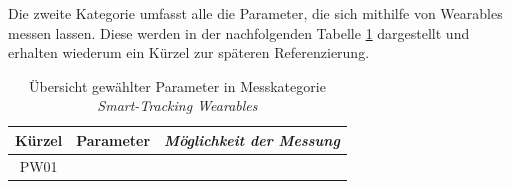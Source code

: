 Die zweite Kategorie umfasst alle die Parameter, die sich mithilfe von Wearables messen lassen. Diese werden in der nachfolgenden Tabelle \ref{tab:pw} dargestellt und erhalten wiederum ein Kürzel zur späteren Referenzierung.


\begin{table}[htbp]
	\caption{Übersicht gewählter Parameter in Messkategorie \textit{Smart-Tracking Wearables}}
	\begin{center}
		\begin{tabular}{c c c }
			\hline
			Kürzel& \textbf{Parameter} & \textbf{\textit{Möglichkeit der Messung}}\\
			\hline
			PW01 && \\
			\hline
		\end{tabular}
		\label{tab:pw}
	\end{center}
\end{table}